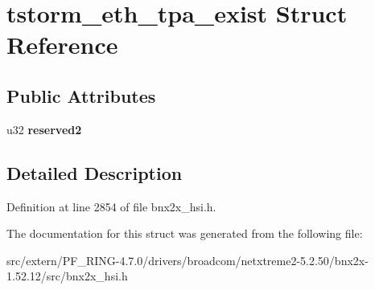 \hypertarget{structtstorm__eth__tpa__exist}{
\section{tstorm\_\-eth\_\-tpa\_\-exist Struct Reference}
\label{structtstorm__eth__tpa__exist}
}
\subsection*{Public Attributes}
\begin{DoxyCompactItemize}
\item 
\hypertarget{structtstorm__eth__tpa__exist_a18fdc14567ded8f9ee0057a7b8898ccf}{
u32 {\bfseries reserved2}}
\label{structtstorm__eth__tpa__exist_a18fdc14567ded8f9ee0057a7b8898ccf}

\end{DoxyCompactItemize}


\subsection{Detailed Description}


Definition at line 2854 of file bnx2x\_\-hsi.h.



The documentation for this struct was generated from the following file:\begin{DoxyCompactItemize}
\item 
src/extern/PF\_\-RING-\/4.7.0/drivers/broadcom/netxtreme2-\/5.2.50/bnx2x-\/1.52.12/src/bnx2x\_\-hsi.h\end{DoxyCompactItemize}
